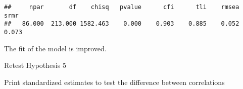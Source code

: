 \documentclass[
]{article}
\newenvironment{Shaded}{\begin{snugshade}}{\end{snugshade}}
\newcommand{\KeywordTok}[1]{\textcolor[rgb]{0.13,0.29,0.53}{\textbf{#1}}}
\newcommand{\NormalTok}[1]{#1}
\newcommand{\OperatorTok}[1]{\textcolor[rgb]{0.81,0.36,0.00}{\textbf{#1}}}
\newcommand{\StringTok}[1]{\textcolor[rgb]{0.31,0.60,0.02}{#1}}
\begin{document}
\begin{verbatim}
##     npar       df    chisq   pvalue      cfi      tli    rmsea     srmr 
##   86.000  213.000 1582.463    0.000    0.903    0.885    0.052    0.073
\end{verbatim}

The fit of the model is improved.

Retest Hypothesis 5

Print standardized estimates to test the difference between correlations

\begin{Shaded}
\end{Shaded}
\end{document}
